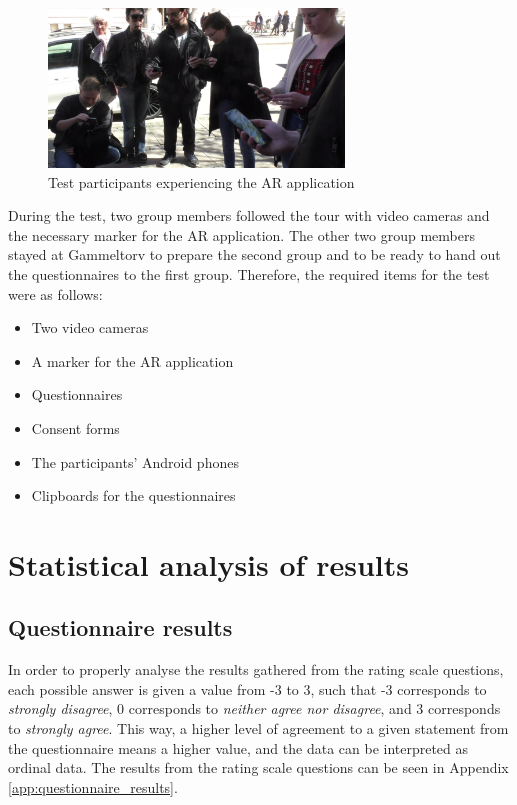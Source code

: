 \begin{figure}[h!]
   \centering
   \includegraphics[width=0.7\textwidth]{figures/participants_app.png}
   \caption{Test participants experiencing the AR application}\label{fig:participants_app}
\end{figure}

During the test, two group members followed the tour with video cameras and the necessary marker for the AR application. The other two group members stayed at Gammeltorv to prepare the second group and to be ready to hand out the questionnaires to the first group. Therefore, the required items for the test were as follows:

\begin{itemize}
\item Two video cameras
\item A marker for the AR application
\item Questionnaires
\item Consent forms
\item The participants’ Android phones
\item Clipboards for the questionnaires
\end{itemize}

\section{Statistical analysis of results} 
\subsection{Questionnaire results}
In order to properly analyse the results gathered from the rating scale questions, each possible answer is given a value from -3 to 3, such that -3 corresponds to \textit{strongly disagree}, 0 corresponds to \textit{neither agree nor disagree}, and 3 corresponds to \textit{strongly agree}. This way, a higher level of agreement to a given statement from the questionnaire means a higher value, and the data can be interpreted as ordinal data. The results from the rating scale questions can be seen in Appendix \ref{app:questionnaire_results}.

